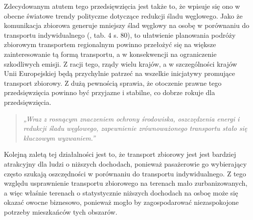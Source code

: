 Zdecydowanym atutem tego przedsięwzięcia jest także to, że wpisuje się ono w obecne światowe trendy polityczne dotyczące redukcji śladu węglowego. Jako że komunikacja zbiorowa generuje mniejszy ślad węglowy na osobę w porównaniu do transportu indywidualnego (\citealt{Szymalski_Bukowicka_2022}, tab. 4 s. 80), to ułatwienie planowania podróży zbiorowym transportem regionalnym powinno przełożyć się na większe zainteresowanie tą formą transportu, a w konsekwencji na ograniczenie szkodliwych emisji. Z racji tego, rządy wielu krajów, a w szczególności krajów Unii Europejskiej będą przychylnie patrzeć na wszelkie inicjatywy promujące transport zbiorowy. Z dużą pewnością sprawia, że otoczenie prawne tego przedsięwzięcia powinno być przyjazne i stabilne, co dobrze rokuje dla przedsięwzięcia.
\begin{quote}\textit{„Wraz z rosnącym znaczeniem ochrony środowiska, oszczędzenia energi i redukcji śladu węglowego, zapewnienie zrównoważonego transportu stało się kluczowym wyzwaniem.”}
\citep{Chung2023-ih} \end{quote}

Kolejną zaletą tej działalności jest to, że transport zbiorowy jest jest bardziej atrakcyjny dla ludzi o niższych dochodach, ponieważ pasażerowie go wybierający często szukają oszczędności w porównaniu do transportu indywidualnego. \citep{Nimorakiotaki2020-bl} Z tego względu usprawnienie transportu zbiorowego na terenach mało zurbanizowanych, a więc właśnie terenach o statystycznie niższych dochodach na osboę może się okazać owocne biznesowo, ponieważ mogło by zagospodarować niezaspokojone potrzeby mieszkańców tych obszarów.